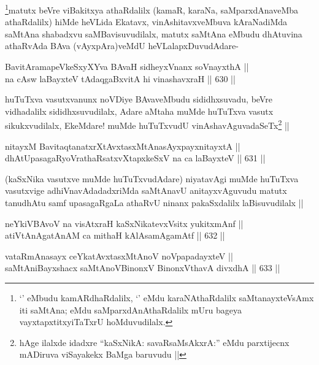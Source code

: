 \begin{artha}
\footnote{`\stext' eMbudu kamARdhaRdalilx, `\stext' eMdu karaNAthaRdalilx saMtanayxteV\s sAmx iti saMtAna; eMdu saMparxdAnAthaRdalilx mUru bageya vayxtapxtitxyiTaTxrU hoMduvudilalx.}matutx beVre viBakitxya athaRdalilx (kamaR, karaNa, saMparxdAnaveMba athaRdalilx) hiMde heVLida Ekatavx, vinAshitavxveMbuva kAraNadiMda saMtAna shabadxvu saMBavisuvudilalx, matutx saMtAna eMbudu dhAtuvina athaRvAda BAva (vAyxpAra)veMdU heVLalapxDuvudAdare-
\end{artha}

\begin{shl}
BavitAramapeVkeSxyXYva BAvaH sidheyxVnanx soV\s nayxthA || \\
na cAsw laBayxteV tAdaqgaBxvitA hi vinashavxraH ||  630 ||  
\end{shl}

\begin{artha}
huTuTxva vasutxvanunx noVDiye BAvaveMbudu sididhxsuvadu, beVre vidhadalilx sididhxsuvudilalx, Adare aMtaha muMde huTuTxva vasutx sikukxvudilalx, EkeMdare! muMde huTuTxvudU vinAshavAguvadaSeTx\footnote{hAge ilalxde idadxre ``kaSxNikA: savaRsaMsAkxrA:'' eMdu parxtijecnx mADiruva viSayakekx BaMga baruvudu ||} ||
\end{artha}

\begin{shl}
nitayxM BavitaqtanatxrXtAvxtasxMtAnasAyxpayxnitayxtA || \\
dhAtUpasagaRyoVrathaRsatxvXtapxkeSxV na ca laBayxteV ||  631 ||  
\end{shl}

\begin{artha}
(kaSxNika vasutxve muMde huTuTxvudAdare) niyatavAgi muMde huTuTxva vasutxvige adhiVnavAdadadxriMda saMtAnavU anitayxvAguvudu matutx tanudhAtu samf upasagaRgaLa athaRvU ninanx pakaSxdalilx laBisuvudilalx ||
\end{artha}


\begin{shl}
neYkiVBAvoV na visAtxraH kaSxNikatevxV\s sitx yukitxmAnf || \\
atiVtAnAgatAnAM ca mithaH kAlAsamAgamAtf ||  632 ||  
\end{shl}
				
\begin{shl}
vataRmAnasayx ceYkatAvxtasxMtAnoV noVpapadayxteV || \\
saMtAniBayxshacx saMtAnoV\s BinonxV BinonxV\s thavA divxdhA ||  633 ||  
\end{shl}

